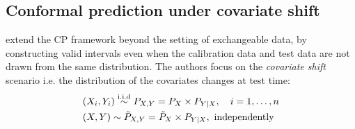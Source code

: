

\subsection{Conformal prediction under covariate shift}\label{CP_cov_shift}
\cite{tibshirani2020conformal} extend the CP framework beyond the setting of exchangeable data, by constructing valid intervals even when the calibration data and test data are not drawn from the same distribution. The authors focus on the \textit{covariate shift} scenario i.e. the distribution of the covariates changes at test time:
\begin{align}
    &(X_i, Y_i) \overset{\textup{i.i.d}}{\sim} P_{X,Y} = P_X \times P_{Y\mid X}, \quad i = 1, \dots, n \nonumber \\
    &(X, Y) \sim \tilde{P}_{X,Y} = \tilde{P}_{X} \times P_{Y\mid X},~\text{independently}\nonumber
\end{align}

